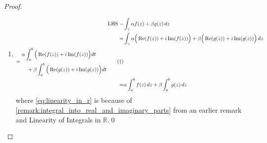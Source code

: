\documentclass[notoc,notitlepage]{tufte-book}
\begin{document}
\begin{proof}
	\begin{enumerate}
		\item \begin{align*}
			\text{LHS}=&\int_{\gamma} \alpha f(z) + \beta g(z) \mathop{}\!d{z} \\
				= &\int_{\gamma} \alpha \Big( \operatorname{Re}(f(z)) + i \operatorname{Im}(f(z)) \Big) + \beta \Big( \operatorname{Re}(g(z)) + i \operatorname{Im}(g(z)) \Big) \mathop{}\!d{z} \\
				= \begin{split}
					&\alpha \int_{a}^{b} \Big( \operatorname{Re}(f(z)) + i \operatorname{Im}(f(z)) \Big) dt \\
					&\quad + \beta \int_{a}^{b} \Big( \operatorname{Re}(g(z)) + i \operatorname{Im}(g(z)) \Big) dt
				\end{split} \tag{$\dagger$}\label{eq:linearity_in_r} \\
				= & \alpha \int_{a}^{b} f(z) \mathop{}\!d{z} + \beta \int_{a}^{b} g(z) \mathop{}\!d{z}
			\end{align*}
			where \eqref{eq:linearity_in_r} is because of \cref{remark:integral_into_real_and_imaginary_parts} from an earlier remark and Linearity of Integrals in $\mathbb{R}$.\qed


\end{enumerate}
\end{proof}
\end{document}
